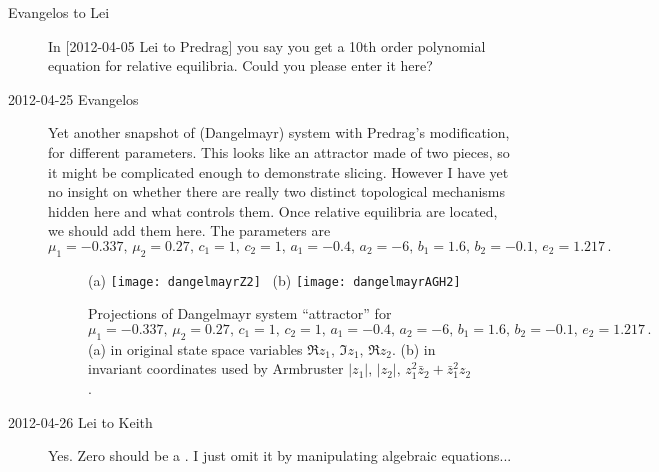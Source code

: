 \begin{description}
\item[Evangelos to Lei] In  [2012-04-05 Lei to Predrag] you say you get a
10th order polynomial equation for relative equilibria. Could you please
enter it here?

\item[2012-04-25 Evangelos] Yet another snapshot of {\twoMode} (Dangelmayr)
system with Predrag's modification, for different parameters. This looks
like an attractor made of two pieces, so it might be complicated enough
to demonstrate slicing. However I have yet no insight on whether there
are really two distinct topological mechanisms hidden here and what
controls them. Once relative equilibria are located, we should add them
here. The parameters are
\[
 \mu_1 = -0.337,\, \mu_2 = 0.27,\, c_1 = 1,\, c_2 = 1,\,
 a_1 = -0.4,\, a_2 = -6,\, b_1 = 1.6,\,  b_2 = -0.1,\, e_2 = 1.217
 \,.
\]

 \begin{figure}[h]
\centering
 (a) \texttt{[image: dangelmayrZ2]}~
 (b) \texttt{[image: dangelmayrAGH2]}~
\caption{Projections of Dangelmayr system 
``attractor'' for $\mu_1 = -0.337,\, \mu_2 = 0.27,\, c_1 = 1,\, c_2 = 1,\,
a_1 = -0.4,\, a_2 = -6,\, b_1 = 1.6,\,  b_2 = -0.1,\, e_2 = 1.217\,.$
(a) in original state space variables $\Re z_1,\,\Im z_1,\,\Re z_2$.
(b) in invariant coordinates used by
Armbruster \etal{} $|z_1|,\, |z_2|,\, z_1^2 \bar{z}_2 + \bar{z}_1^2 z_2$.
}
 \label{fig:dangelmayrChaos2}
\end{figure}

\item[2012-04-26 Lei to Keith] Yes. Zero should be a \eqv. I just
omit it by manipulating algebraic equations...

%


\end{description}
